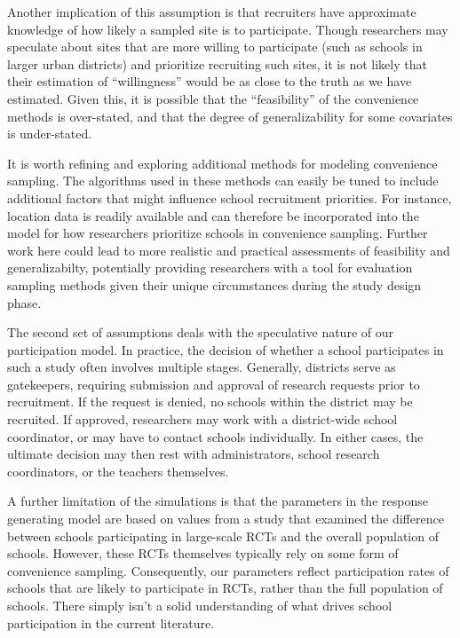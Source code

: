 \documentclass[
  english,
  man,floatsintext]{apa6}
\begin{document}
Another implication of this assumption is that recruiters have approximate knowledge of how likely a sampled site is to participate. Though researchers may speculate about sites that are more willing to participate (such as schools in larger urban districts) and prioritize recruiting such sites, it is not likely that their estimation of \enquote{willingness} would be as close to the truth as we have estimated. Given this, it is possible that the \enquote{feasibility} of the convenience methods is over-stated, and that the degree of generalizability for some covariates is under-stated.

It is worth refining and exploring additional methods for modeling convenience sampling. The algorithms used in these methods can easily be tuned to include additional factors that might influence school recruitment priorities. For instance, location data is readily available and can therefore be incorporated into the model for how researchers prioritize schools in convenience sampling. Further work here could lead to more realistic and practical assessments of feasibility and generalizabilty, potentially providing researchers with a tool for evaluation sampling methods given their unique circumstances during the study design phase.

The second set of assumptions deals with the speculative nature of our participation model. In practice, the decision of whether a school participates in such a study often involves multiple stages. Generally, districts serve as gatekeepers, requiring submission and approval of research requests prior to recruitment. If the request is denied, no schools within the district may be recruited. If approved, researchers may work with a district-wide school coordinator, or may have to contact schools individually. In either cases, the ultimate decision may then rest with administrators, school research coordinators, or the teachers themselves.

A further limitation of the simulations is that the parameters in the response generating model are based on values from a study that examined the difference between schools participating in large-scale RCTs and the overall population of schools. However, these RCTs themselves typically rely on some form of convenience sampling. Consequently, our parameters reflect participation rates of schools that are likely to participate in RCTs, rather than the full population of schools. There simply isn't a solid understanding of what drives school participation in the current literature.
\end{document}
